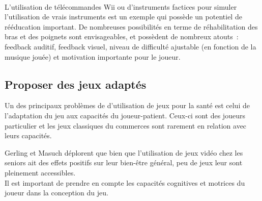 \paragraph{} L'utilisation de télécommandes Wii ou d'instruments factices pour simuler l'utilisation de vrais instruments est un exemple qui possède un potentiel de rééducation important. De nombreuses possibilités en terme de réhabilitation des bras et des poignets sont envisageables, et possèdent de nombreux atouts~: feedback auditif, feedback visuel, niveau de difficulté ajustable (en fonction de la musique jouée) et motivation importante pour le joueur.

		\subsection{Proposer des jeux adaptés}
Un des principaux problèmes de d'utilisation de jeux pour la santé est celui de l'adaptation du jeu aux capacités du joueur-patient\cite{Flor08}. Ceux-ci sont des joueurs particulier et les jeux classiques du commerces sont rarement en relation avec leurs capacités.

Gerling et Masuch\cite{Gerl11} déplorent que bien que l'utilisation de jeux vidéo chez les seniors ait des effets positifs sur leur bien-être général, peu de jeux leur sont pleinement accessibles.\\
Il est important de prendre en compte les capacités cognitives et motrices du joueur dans la conception du jeu.


